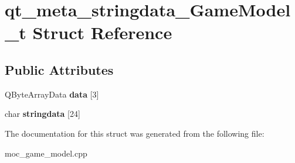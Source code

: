 \hypertarget{structqt__meta__stringdata__GameModel__t}{\section{qt\-\_\-meta\-\_\-stringdata\-\_\-\-Game\-Model\-\_\-t Struct Reference}
\label{structqt__meta__stringdata__GameModel__t}
}
\subsection*{Public Attributes}
\begin{DoxyCompactItemize}
\item 
\hypertarget{structqt__meta__stringdata__GameModel__t_ae288c11ab2f5aec06b0b7117898368b3}{Q\-Byte\-Array\-Data {\bfseries data} \mbox{[}3\mbox{]}}\label{structqt__meta__stringdata__GameModel__t_ae288c11ab2f5aec06b0b7117898368b3}

\item 
\hypertarget{structqt__meta__stringdata__GameModel__t_a61a3a35339f6f988810b0e600a9efab8}{char {\bfseries stringdata} \mbox{[}24\mbox{]}}\label{structqt__meta__stringdata__GameModel__t_a61a3a35339f6f988810b0e600a9efab8}

\end{DoxyCompactItemize}


The documentation for this struct was generated from the following file\-:\begin{DoxyCompactItemize}
\item 
moc\-\_\-game\-\_\-model.\-cpp\end{DoxyCompactItemize}
